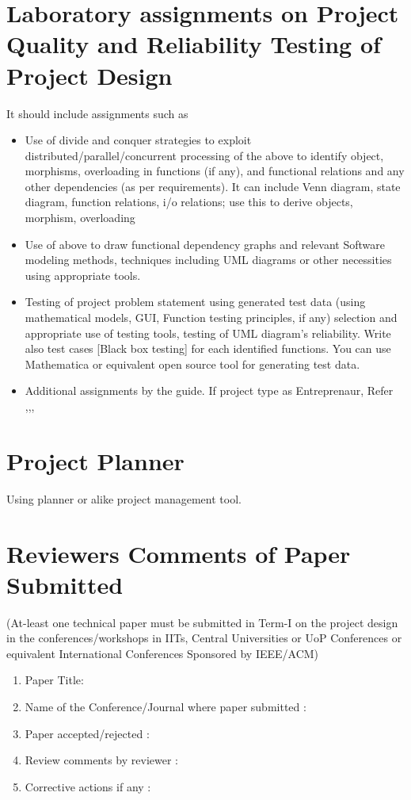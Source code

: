 \documentclass[oneside,a4paper,12pt]{report}
\begin{document}
\begin{appendices}
\chapter{Laboratory assignments on Project Quality and Reliability Testing of Project Design}

It should include assignments such as
\begin{itemize}
\item Use of divide and conquer strategies to exploit distributed/parallel/concurrent processing of the above to identify object, morphisms, overloading in functions (if any), and functional relations and any other dependencies (as per requirements).
             It can include Venn diagram, state diagram, function relations, i/o relations; use this to derive objects, morphism, overloading

\item Use of above to draw functional dependency graphs and relevant Software modeling methods, techniques
including UML diagrams or other necessities using appropriate tools.
\item Testing of project problem statement using generated test data (using mathematical models, GUI, Function testing principles, if any) selection and appropriate use of testing tools, testing of UML diagram's reliability. Write also test cases [Black box testing] for each identified functions. 
You can use Mathematica or equivalent open source tool for generating test data. 
\item Additional assignments by the guide. If project type as Entreprenaur, Refer \cite{ehr},\cite{mckinsey},\cite{mckinseyweb}, \cite{govwebsite}
\end{itemize}


\chapter{Project Planner}
\label{app:plan}
Using planner or alike project management tool.




\chapter{Reviewers Comments of Paper Submitted}
(At-least one technical paper must be submitted in Term-I on the project design in the
conferences/workshops in IITs, Central Universities or UoP Conferences or equivalent International Conferences Sponsored by IEEE/ACM)
\begin{enumerate}
\item Paper Title:
\item Name of the Conference/Journal where paper submitted :
\item Paper accepted/rejected : 
\item Review comments by reviewer :
\item Corrective actions if any :  


\end{enumerate}
\end{appendices}
\end{document}
